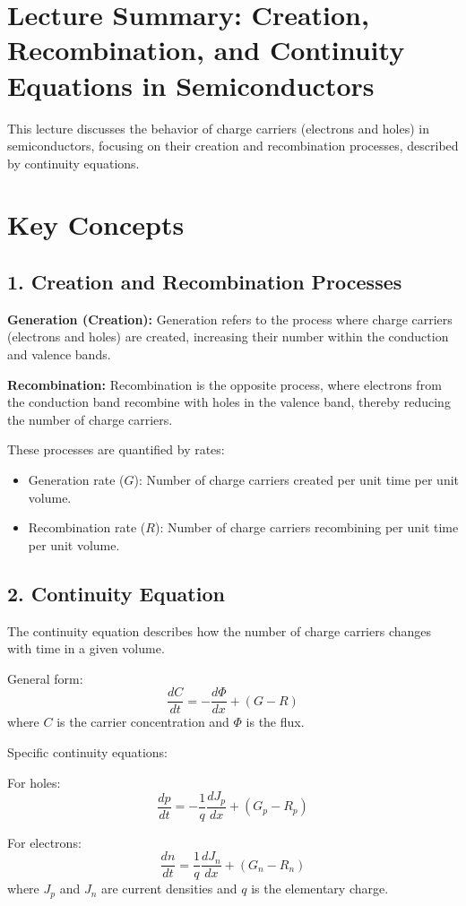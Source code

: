 \documentclass{article}
\begin{document}
\section*{Lecture Summary: Creation, Recombination, and Continuity Equations in Semiconductors}

This lecture discusses the behavior of charge carriers (electrons and holes) in semiconductors, focusing on their creation and recombination processes, described by continuity equations.

\section*{Key Concepts}

\subsection*{1. Creation and Recombination Processes}
\textbf{Generation (Creation):}
Generation refers to the process where charge carriers (electrons and holes) are created, increasing their number within the conduction and valence bands.

\textbf{Recombination:}
Recombination is the opposite process, where electrons from the conduction band recombine with holes in the valence band, thereby reducing the number of charge carriers.

These processes are quantified by rates:
\begin{itemize}
\item Generation rate ($G$): Number of charge carriers created per unit time per unit volume.
\item Recombination rate ($R$): Number of charge carriers recombining per unit time per unit volume.
\end{itemize}

\subsection*{2. Continuity Equation}
The continuity equation describes how the number of charge carriers changes with time in a given volume.

General form:
\[
\frac{dC}{dt} = -\frac{d\Phi}{dx} + (G - R)
\]
where $C$ is the carrier concentration and $\Phi$ is the flux.

Specific continuity equations:

For holes:
\[
\frac{dp}{dt} = -\frac{1}{q}\frac{dJ_p}{dx} + (G_p - R_p)
\]

For electrons:
\[
\frac{dn}{dt} = \frac{1}{q}\frac{dJ_n}{dx} + (G_n - R_n)
\]
where $J_p$ and $J_n$ are current densities and $q$ is the elementary charge.
\end{document}
